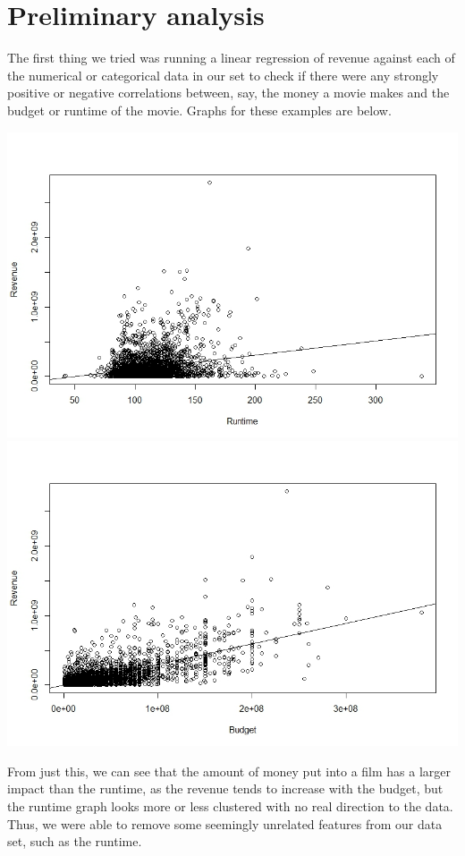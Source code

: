 \documentclass{article}
\begin{document}
\section{Preliminary analysis}

The first thing we tried was running a linear regression of revenue against each of the numerical or categorical data in our set to check if there were any strongly positive or negative correlations between, say, the money a movie makes and the budget or runtime of the movie.  Graphs for these examples are below.

\hspace*{-3.5cm}
\includegraphics[scale = .4]{rvr.jpeg}
\includegraphics[scale = .4]{bvr.jpeg}

From just this, we can see that the amount of money put into a film has a larger impact than the runtime, as the revenue tends to increase with the budget, but the runtime graph looks more or less clustered with no real direction to the data.  Thus, we were able to remove some seemingly unrelated features from our data set, such as the runtime.  
\end{document}
